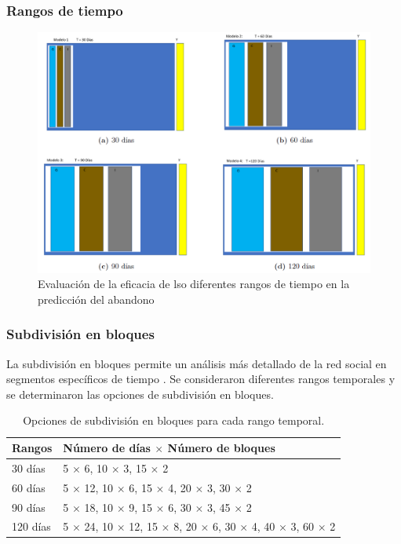 \documentclass{beamer}
\begin{document}
\begin{frame}
	\frametitle{Rangos de tiempo}
	\begin{figure}
		\centering
		\includegraphics[width=0.7\linewidth]{figs/fig1}
		\caption{Evaluación de la eficacia de lso diferentes rangos de tiempo en la predicción del abandono}
		\label{fig:fig1}
	\end{figure}
\end{frame}


\begin{frame}
	\frametitle{Subdivisión en bloques}
	La subdivisión en bloques permite un análisis más detallado de la red social en segmentos específicos de tiempo \citep{kim2012a}. Se consideraron diferentes rangos temporales y se determinaron las opciones de subdivisión en bloques. 
	\begin{table}[H]
		\centering
		\begin{tabular}{ll}
			\toprule
			Rangos & Número de días $\times$ Número de bloques \\
			\midrule
			30 días & 5 $\times$ 6, 10 $\times$ 3, 15 $\times$ 2 \\
			60 días & 5 $\times$ 12, 10 $\times$ 6, 15 $\times$ 4, 20 $\times$ 3, 30 $\times$ 2 \\
			90 días & 5 $\times$ 18, 10 $\times$ 9, 15 $\times$ 6, 30 $\times$ 3, 45 $\times$ 2 \\
			120 días & 5 $\times$ 24, 10 $\times$ 12, 15 $\times$ 8, 20 $\times$ 6, 30 $\times$ 4, 40 $\times$ 3, 60 $\times$ 2 \\
			\bottomrule
		\end{tabular}
		\caption{Opciones de subdivisión en bloques para cada rango temporal.}
		
		\label{tab:subdivision-bloques1}
	\end{table}

\end{frame}
\end{document}
